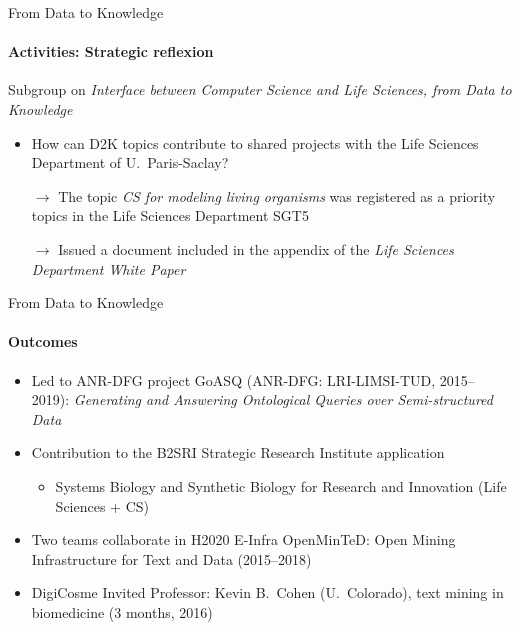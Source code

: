 \begin{frame}{From Data to Knowledge}
\framesubtitle{Activities: Strategic reflexion}

Subgroup on \emph{Interface between Computer Science and Life Sciences, from Data to Knowledge}
  \begin{itemize}
  \item How can D2K topics contribute to shared projects with the Life Sciences Department of U.~Paris-Saclay?
  \item[$\rightarrow$] The topic \emph{CS for modeling living organisms} was registered as a priority topics in the Life Sciences Department SGT5
  \item[$\rightarrow$] Issued a document included in the appendix of the \emph{Life Sciences Department White Paper}
\end{itemize}

\end{frame}

\begin{frame}{From Data to Knowledge}
\framesubtitle{Outcomes}

\begin{itemize}
\item Led to ANR-DFG project GoASQ (ANR-DFG: LRI-LIMSI-TUD, 2015--2019): \emph{Generating and Answering Ontological Queries over Semi-structured Data}
\item Contribution to the B2SRI Strategic Research Institute application
  \begin{itemize}
  \item Systems Biology and Synthetic Biology for Research and Innovation (Life Sciences + CS)
  \end{itemize}
\item Two teams collaborate in H2020 E-Infra OpenMinTeD: Open Mining Infrastructure for Text and Data (2015--2018)
\item DigiCosme Invited Professor: Kevin B.\ Cohen (U.\ Colorado), text mining in biomedicine (3 months, 2016)
\end{itemize}

\end{frame}


